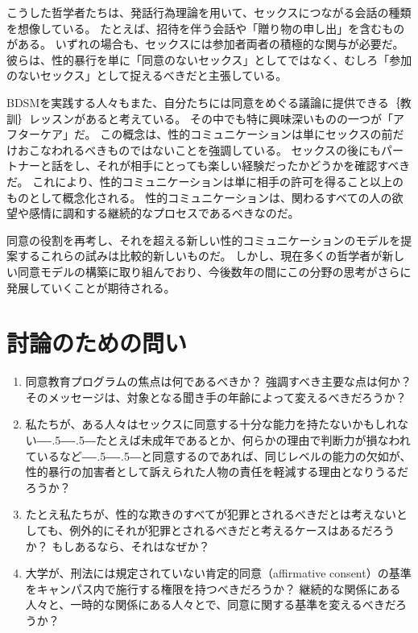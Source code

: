 \documentclass[paper=a4,book,openany]{jlreq}
\def\DDASH{―\kern-.5\zw―\kern-.5\zw―} %
\begin{document}
こうした哲学者たちは、発話行為理論を用いて、セックスにつながる会話の種類を想像している。
たとえば、招待を伴う会話や「贈り物の申し出」を含むものがある\citep[p.74]{kukla18:_thats_what_she_said}。
いずれの場合も、セックスには参加者両者の積極的な関与が必要だ。
彼らは、性的暴行を単に「同意のないセックス」としてではなく、むしろ「参加のないセックス」として捉えるべきだと主張している。

BDSMを実践する人々もまた、自分たちには同意をめぐる議論に提供できる｛教訓｝{レッスン}があると考えている。
その中でも特に興味深いものの一つが「アフターケア」だ。
この概念は、性的コミュニケーションは単にセックスの前だけおこなわれるべきものではないことを強調している。
セックスの後にもパートナーと話をし、それが相手にとっても楽しい経験だったかどうかを確認すべきだ。
これにより、性的コミュニケーションは単に相手の許可を得ること以上のものとして概念化される。
性的コミュニケーションは、関わるすべての人の欲望や感情に調和する継続的なプロセスであるべきなのだ。

同意の役割を再考し、それを超える新しい性的コミュニケーションのモデルを提案するこれらの試みは比較的新しいものだ。
しかし、現在多くの哲学者が新しい同意モデルの構築に取り組んでおり、今後数年の間にこの分野の思考がさらに発展していくことが期待される。

\section{討論のための問い}

\begin{enumerate}

\item 同意教育プログラムの焦点は何であるべきか？ 強調すべき主要な点は何か？ そのメッセージは、対象となる聞き手の年齢によって変えるべきだろうか？

\item  私たちが、ある人々はセックスに同意する十分な能力を持たないかもしれない{\DDASH}たとえば未成年であるとか、何らかの理由で判断力が損なわれているなど{\DDASH}と同意するのであれば、同じレベルの能力の欠如が、性的暴行の加害者として訴えられた人物の責任を軽減する理由となりうるだろうか？

\item  たとえ私たちが、性的な欺きのすべてが犯罪とされるべきだとは考えないとしても、例外的にそれが犯罪とされるべきだと考えるケースはあるだろうか？ もしあるなら、それはなぜか？

\item  大学が、刑法には規定されていない肯定的同意（affirmative consent）の基準をキャンパス内で施行する権限を持つべきだろうか？ 継続的な関係にある人々と、一時的な関係にある人々とで、同意に関する基準を変えるべきだろうか？
\end{enumerate}
\end{document}
